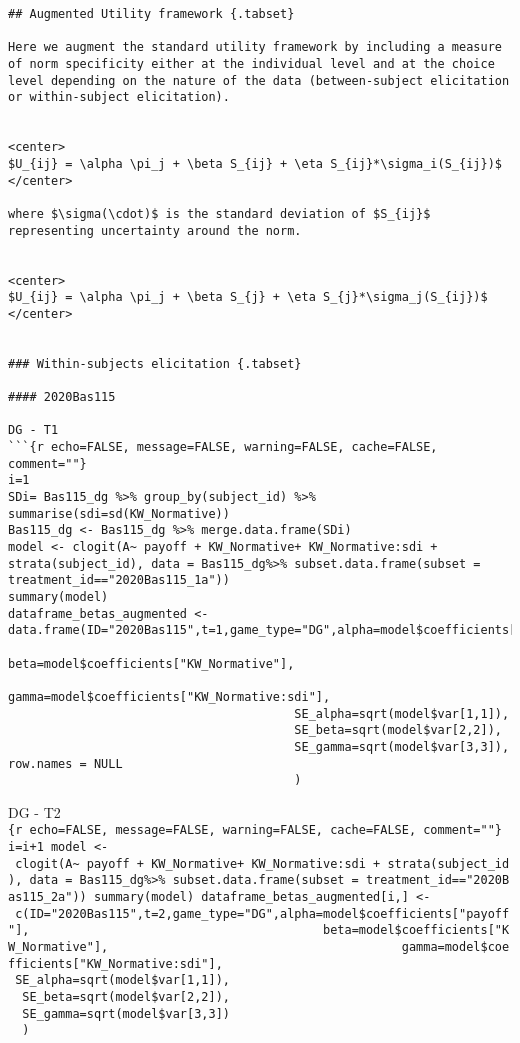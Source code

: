\begin{verbatim}
## Augmented Utility framework {.tabset}

Here we augment the standard utility framework by including a measure of norm specificity either at the individual level and at the choice level depending on the nature of the data (between-subject elicitation or within-subject elicitation).


<center>
$U_{ij} = \alpha \pi_j + \beta S_{ij} + \eta S_{ij}*\sigma_i(S_{ij})$ 
</center>

where $\sigma(\cdot)$ is the standard deviation of $S_{ij}$ representing uncertainty around the norm.


<center>
$U_{ij} = \alpha \pi_j + \beta S_{j} + \eta S_{j}*\sigma_j(S_{ij})$ 
</center>


### Within-subjects elicitation {.tabset}

#### 2020Bas115

DG - T1
```{r echo=FALSE, message=FALSE, warning=FALSE, cache=FALSE, comment=""}
i=1
SDi= Bas115_dg %>% group_by(subject_id) %>% summarise(sdi=sd(KW_Normative))
Bas115_dg <- Bas115_dg %>% merge.data.frame(SDi)
model <- clogit(A~ payoff + KW_Normative+ KW_Normative:sdi + strata(subject_id), data = Bas115_dg%>% subset.data.frame(subset = treatment_id=="2020Bas115_1a"))
summary(model)
dataframe_betas_augmented <- data.frame(ID="2020Bas115",t=1,game_type="DG",alpha=model$coefficients["payoff"],
                                        beta=model$coefficients["KW_Normative"],
                                        gamma=model$coefficients["KW_Normative:sdi"],
                                        SE_alpha=sqrt(model$var[1,1]),
                                        SE_beta=sqrt(model$var[2,2]),
                                        SE_gamma=sqrt(model$var[3,3]), row.names = NULL
                                        )
\end{verbatim}

DG - T2
\texttt{\{r\ echo=FALSE,\ message=FALSE,\ warning=FALSE,\ cache=FALSE,\ comment=""\}\ i=i+1\ model\ \textless{}-\ clogit(A\textasciitilde{}\ payoff\ +\ KW\_Normative+\ KW\_Normative:sdi\ +\ strata(subject\_id),\ data\ =\ Bas115\_dg\%\textgreater{}\%\ subset.data.frame(subset\ =\ treatment\_id=="2020Bas115\_2a"))\ summary(model)\ dataframe\_betas\_augmented{[}i,{]}\ \textless{}-\ c(ID="2020Bas115",t=2,game\_type="DG",alpha=model\$coefficients{[}"payoff"{]},\ \ \ \ \ \ \ \ \ \ \ \ \ \ \ \ \ \ \ \ \ \ \ \ \ \ \ \ \ \ \ \ \ \ \ \ \ \ \ \ \ beta=model\$coefficients{[}"KW\_Normative"{]},\ \ \ \ \ \ \ \ \ \ \ \ \ \ \ \ \ \ \ \ \ \ \ \ \ \ \ \ \ \ \ \ \ \ \ \ \ \ \ \ \ gamma=model\$coefficients{[}"KW\_Normative:sdi"{]},\ \ \ \ \ \ \ \ \ \ \ \ \ \ \ \ \ \ \ \ \ \ \ \ \ \ \ \ \ \ \ \ \ \ \ \ \ \ \ \ \ SE\_alpha=sqrt(model\$var{[}1,1{]}),\ \ \ \ \ \ \ \ \ \ \ \ \ \ \ \ \ \ \ \ \ \ \ \ \ \ \ \ \ \ \ \ \ \ \ \ \ \ \ \ \ SE\_beta=sqrt(model\$var{[}2,2{]}),\ \ \ \ \ \ \ \ \ \ \ \ \ \ \ \ \ \ \ \ \ \ \ \ \ \ \ \ \ \ \ \ \ \ \ \ \ \ \ \ \ SE\_gamma=sqrt(model\$var{[}3,3{]})\ \ \ \ \ \ \ \ \ \ \ \ \ \ \ \ \ \ \ \ \ \ \ \ \ \ \ \ \ \ \ \ \ \ \ \ \ \ \ \ \ )}

